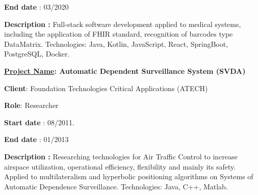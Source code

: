\begin{itemize}
\begin{justify}
{\fontsize{10pt}{12.0pt}\selectfont \textbf{End date \tabto{0.5in} }:\textbf{ }03/2020\par}
\end{justify}\par

\begin{justify}
{\fontsize{10pt}{12.0pt}\selectfont \textbf{Description \tab : }Full-stack\textbf{ }software development applied to medical systems, including the application of FHIR standard, recognition of barcodes type DataMatrix. Technologies: Java, Kotlin, JavaScript, React, SpringBoot, PostgreSQL, Docker.\par}
\end{justify}\par


\vspace{\baselineskip}
\begin{justify}
\item {\fontsize{10pt}{12.0pt}\selectfont \textbf{\uline{Project Name}: Automatic Dependent Surveillance System (SVDA)}\par}
\end{justify}\par

{\fontsize{10pt}{12.0pt}\selectfont \textbf{Client}\tab \tab : Foundation Technologies Critical Applications (ATECH)\par}\par

{\fontsize{10pt}{12.0pt}\selectfont \textbf{Role}\tab \tab : Researcher\par}\par

{\fontsize{10pt}{12.0pt}\selectfont \textbf{Start date} \tab : 08/2011.\par}\par

\begin{justify}
{\fontsize{10pt}{12.0pt}\selectfont \textbf{End date \tabto{0.5in} }:\textbf{ }01/2013\par}
\end{justify}\par

\begin{justify}
{\fontsize{10pt}{12.0pt}\selectfont \textbf{Description \tab : }Researching technologies for Air Traffic Control to increase airspace utilization, operational efficiency, flexibility and mainly its safety. Applied to multilateralism and hyperbolic positioning algorithms on Systems of Automatic Dependence Surveillance. Technologies: Java, C++, Matlab.\par}
\end{justify}\par



\end{itemize}
